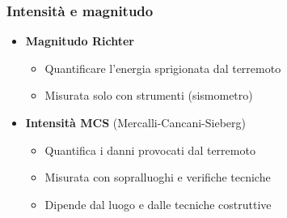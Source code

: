\begin{frame}
	\frametitle{Intensità e magnitudo}
	\begin{itemize}
	\item \textbf{Magnitudo Richter}
		\begin{itemize}
			\item Quantificare l'energia sprigionata dal terremoto
			\item Misurata solo con strumenti (sismometro)
		\end{itemize}
	\item<2-> \textbf{Intensità MCS} (Mercalli-Cancani-Sieberg)
		\begin{itemize}
			\item Quantifica i danni provocati dal terremoto
			\item Misurata con sopralluoghi e verifiche tecniche
			\item Dipende dal luogo e dalle tecniche costruttive
		\end{itemize}
	\end{itemize}
\end{frame}
